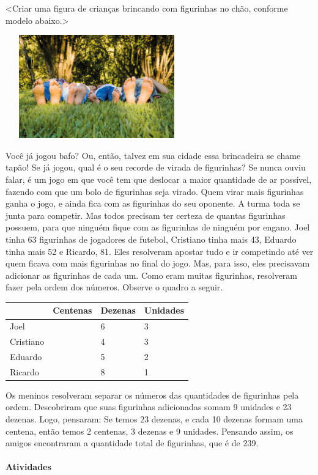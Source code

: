 \textless{}Criar uma figura de crianças brincando com figurinhas no
chão, conforme modelo abaixo.\textgreater{}

\includegraphics[width=3.10417in,height=1.76042in]{media/image28.png}

Você já jogou bafo? Ou, então, talvez em sua cidade essa brincadeira se
chame tapão! Se já jogou, qual é o seu recorde de virada de figurinhas?
Se nunca ouviu falar, é um jogo em que você tem que deslocar a
maior quantidade de ar possível, fazendo com que um bolo de figurinhas
seja virado. Quem virar mais figurinhas ganha o jogo, e ainda fica com
as figurinhas do seu oponente. A turma toda se junta para competir. Mas
todos precisam ter certeza de quantas figurinhas possuem, para que
ninguém fique com as figurinhas de ninguém por engano. Joel tinha 63
figurinhas de jogadores de futebol, Cristiano tinha mais 43, Eduardo
tinha mais 52 e Ricardo, 81. Eles resolveram apostar tudo e ir
competindo até ver quem ficava com mais figurinhas no final do jogo. Mas,
para isso, eles precisavam adicionar as figurinhas de cada um. Como
eram muitas figurinhas, resolveram fazer pela ordem dos números. Observe
o quadro a seguir.

\begin{longtable}[]{@{}llll@{}}
\toprule
& Centenas & Dezenas & Unidades\tabularnewline
\midrule
\endhead
Joel & & 6 & 3\tabularnewline
Cristiano & & 4 & 3\tabularnewline
Eduardo & & 5 & 2\tabularnewline
Ricardo & & 8 & 1\tabularnewline
\bottomrule
\end{longtable}

Os meninos resolveram separar os números das quantidades de figurinhas
pela ordem. Descobriram que suas figurinhas adicionadas somam 9 unidades
e 23 dezenas. Logo, pensaram: Se temos 23 dezenas, e cada 10 dezenas
formam uma centena, então temos 2 centenas, 3 dezenas e 9 unidades.
Pensando assim, os amigos encontraram a quantidade total de figurinhas, que é de 239.

\paragraph{Atividades}\label{atividades-1}

